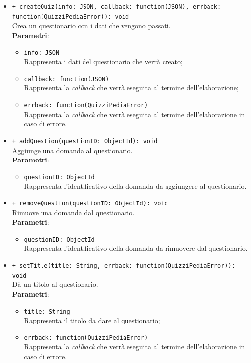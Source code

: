\begin{itemize}
\begin{itemize}
			\item \texttt{+ createQuiz(info: JSON, callback: function(JSON), errback: function(QuizziPediaError)): void}\\
			Crea un questionario con i dati che vengono passati.\\
			\textbf{Parametri}:
			\begin{itemize}
				\item \texttt{info: JSON}\\
				Rappresenta i dati del questionario che verrà creato;
				\item \texttt{callback: function(JSON)}\\
				Rappresenta la \textit{callback} che verrà eseguita al termine dell'elaborazione;
				\item \texttt{errback: function(QuizziPediaError)}\\
				Rappresenta la \textit{callback} che verrà eseguita al termine dell'elaborazione in caso di errore.
			\end{itemize}
			
			\item \texttt{+ addQuestion(questionID: ObjectId): void}\\
			Aggiunge una domanda al questionario.\\
			\textbf{Parametri}:
			\begin{itemize}
				\item \texttt{questionID: ObjectId}\\
				Rappresenta l'identificativo della domanda da aggiungere al questionario.
			\end{itemize}
			
			\item \texttt{+ removeQuestion(questionID: ObjectId): void}\\
			Rimuove una domanda dal questionario.\\
			\textbf{Parametri}:
			\begin{itemize}
				\item \texttt{questionID: ObjectId}\\
				Rappresenta l'identificativo della domanda da rimuovere dal questionario.
			\end{itemize}
			
			\item \texttt{+ setTitle(title: String, errback: function(QuizziPediaError)): void}\\ 		
			Dà un titolo al questionario.\\
			\textbf{Parametri}:
			\begin{itemize}
				\item \texttt{title: String}\\
				Rappresenta il titolo da dare al questionario;
				\item \texttt{errback: function(QuizziPediaError)}\\
				Rappresenta la \textit{callback} che verrà eseguita al termine dell'elaborazione in caso di errore.
			\end{itemize}
			

\end{itemize}
\end{itemize}
